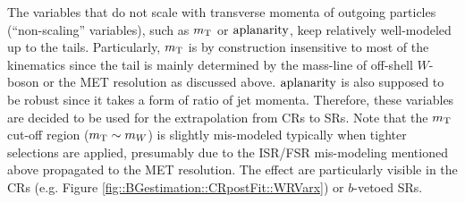 %
%
The variables that do not scale with transverse momenta of outgoing particles (``non-scaling'' variables), such as $m_{\mathrm{T}}$ or $\mathrm{aplanarity}$, keep relatively well-modeled up to the tails. Particularly, $m_{\mathrm{T}}$ is by construction insensitive to most of the kinematics since the tail is mainly determined by the mass-line of off-shell $W$-boson or the MET resolution as discussed above. $\mathrm{aplanarity}$ is also supposed to be robust since it takes a form of ratio of jet momenta. Therefore, these variables are decided to be used for the extrapolation from CRs to SRs. Note that the $m_{\mathrm{T}}$ cut-off region ($m_{\mathrm{T}} \sim m_W$) is slightly mis-modeled typically when tighter selections are applied, presumably 
due to the ISR/FSR mis-modeling mentioned above propagated to the MET resolution.
The effect are particularly visible in the CRs (e.g. Figure \ref{fig::BGestimation::CRpostFit::WRVarx}) or $b$-vetoed SRs.


%
%
\clearpage






